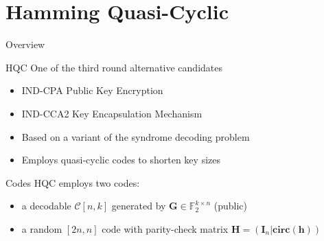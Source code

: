 
\section{Hamming Quasi-Cyclic}
\begin{frame}
    \sectionpage
\end{frame}

\begin{frame}{Overview}
    \begin{block}{HQC}
        One of the third round alternative candidates
        \begin{itemize}
            \item IND-CPA Public Key Encryption
            \item IND-CCA2 Key Encapsulation Mechanism
            \item Based on a variant of the syndrome decoding problem
            \item Employs quasi-cyclic codes to shorten key sizes
        \end{itemize}
    \end{block}
    \begin{block}{Codes}
        HQC employs two codes:
        \begin{itemize}
            \item a decodable $\mathcal{C} [n, k]$ generated by $\mathbf{G}\in \mathds{F}_{2}^{k\times n}$ (public) 
            \item a random $[2n, n]$ code with parity-check matrix $\mathbf{H} = (\mathbf{I}_n | \mathbf{circ(h)})$
        \end{itemize}
    \end{block}
\end{frame}

